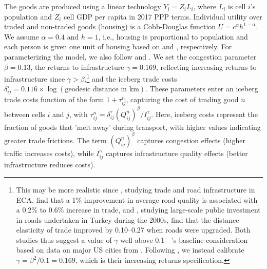 \documentclass[a4paper]{article}
\begin{document}
 The goods are produced using a linear technology $Y_i = Z_i L_i$, where $L_i$ is cell $i$'s population and $Z_i$ cell GDP per capita in 2017 PPP terms. Individual utility over traded and non-traded goods (housing) is a Cobb-Douglas function $U = c^\alpha h^{1-\alpha}$. We assume $\alpha = 0.4$ and $h = 1$, i.e., housing is proportional to population and each person is given one unit of housing based on  \citet{fajgelbaum2020optimal} and \citet{graff2024spatial}, respectively. For parameterizing the model, we also follow \citet{fajgelbaum2020optimal} and \citet{graff2024spatial}. 
 We set the congestion parameter $\beta = 0.13$, the returns to infrastructure $\gamma = 0.169$, reflecting increasing returns to infrastructure since $\gamma > \beta$,\footnote{This may be more realistic since \citet{shepherd2007trade}, studying trade and road infrastructure in ECA, find that a 1\% improvement in average road quality is associated with a 0.2\% to 0.6\% increase in trade, and \citet{cocsar2016domestic}, studying large-scale public investment in roads undertaken in Turkey during the 2000s, find that the distance elasticity of trade improved by 0.10–0.27 when roads were upgraded. Both studies thus suggest a value of $\gamma$ well above 0.1---\citet{fajgelbaum2020optimal}'s baseline consideration based on data on major US cities from \citet{couture2018speed}. Following \citet{fajgelbaum2020optimal}, we instead calibrate $\gamma = \beta^2/0.1 = 0.169$, which is their increasing returns specification.} and the iceberg trade costs $\delta^\tau_{ij} = 0.116 \times \log(\text{geodesic distance in km})$. 
These parameters enter an iceberg trade costs function of the form $1+\tau^n_{ij}$, capturing the cost of trading good $n$ between cells $i$ and $j$, with $\tau^n_{ij} = \delta^\tau_{ij} (Q^n_{ij})^\beta / I_{ij}^\gamma$. Here, iceberg costs represent the fraction of goods that 'melt away' during transport, with higher values indicating greater trade frictions. The term $(Q^n_{ij})^\beta$ captures congestion effects (higher traffic increases costs), while $I_{ij}^\gamma$ captures infrastructure quality effects (better infrastructure reduces costs). %
\end{document}

